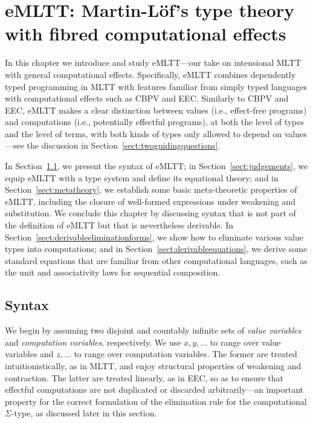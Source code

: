 
\chapter[eMLTT: Martin-L\"{o}f's type theory with fibred computational effects]{eMLTT: Martin-L\"{o}f's type theory \\with fibred computational effects}
\label{chap:syntax}

In this chapter we introduce and study eMLTT---our take on intensional MLTT with general computational effects. 
Specifically, eMLTT combines dependently typed programming in MLTT with features familiar from simply typed languages with computational effects such as CBPV and EEC. 
%
Similarly to CBPV and EEC, eMLTT makes a clear distinction between values (i.e., effect-free programs) and computations (i.e., potentially effectful programs), at both the level of types and the level of terms, with both kinds of types only allowed to depend on values---see the discussion in Section~\ref{sect:twoguidingquestions}.
%


In Section~\ref{sect:syntax}, we present the syntax of eMLTT; in Section~\ref{sect:judgements}, we 
equip eMLTT with a type system and define its equational theory; and in Section~\ref{sect:metatheory}, we establish some basic meta-theoretic properties of eMLTT, including the closure of well-formed expressions under weakening and substitution. We conclude this chapter by discussing syntax that is not part of the definition of eMLTT but that is nevertheless derivable. In Section~\ref{sect:derivableeliminationforms}, we show how to eliminate various value types into computations;  and in Section~\ref{sect:derivableequations}, we derive some standard equations that are familiar from other computational languages, such as the unit and associativity laws for sequential composition.

\section{Syntax}
\label{sect:syntax}



We begin by assuming two disjoint and countably infinite sets of \emph{value variables} and 
\emph{computation variables}, respectively. 
We use $x,y,\ldots$ to range over value variables and 
$z, \ldots$ to range over computation variables. 
The former are treated intuitionistically, as in MLTT, and enjoy structural properties of weakening and contraction. The latter are treated linearly, as in EEC, so as to ensure that effectful computations are not duplicated or discarded arbitrarily---an important property for the correct formulation of the elimination rule for the computational $\Sigma$-type, as discussed later in this section.


